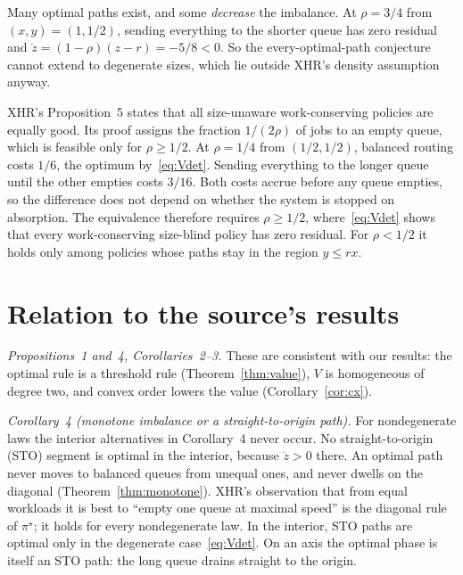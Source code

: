 \documentclass[11pt]{article}
\numberwithin{equation}{section}
\theoremstyle{definition}
\theoremstyle{remark}
\begin{document}
Many optimal paths exist, and some \emph{decrease} the imbalance. At $\rho=3/4$ from $(x,y)=(1,1/2)$, sending everything to the shorter queue has zero residual and $\dot z=(1-\rho)(z-r)=-5/8<0$. So the every-optimal-path conjecture cannot extend to degenerate sizes, which lie outside XHR's density assumption anyway.

XHR's Proposition~5 states that all size-unaware work-conserving policies are equally good. Its proof assigns the fraction $1/(2\rho)$ of jobs to an empty queue, which is feasible only for $\rho\ge1/2$. At $\rho=1/4$ from $(1/2,1/2)$, balanced routing costs $1/6$, the optimum by~\eqref{eq:Vdet}. Sending everything to the longer queue until the other empties costs $3/16$. Both costs accrue before any queue empties, so the difference does not depend on whether the system is stopped on absorption. The equivalence therefore requires $\rho\ge1/2$, where~\eqref{eq:Vdet} shows that every work-conserving size-blind policy has zero residual. For $\rho<1/2$ it holds only among policies whose paths stay in the region $y\le rx$.

\section{Relation to the source's results}\label{sec:source}

\emph{Propositions~1 and~4, Corollaries~2--3.} These are consistent with our results: the optimal rule is a threshold rule (Theorem~\ref{thm:value}), $V$ is homogeneous of degree two, and convex order lowers the value (Corollary~\ref{cor:cx}).

\emph{Corollary~4 (monotone imbalance or a straight-to-origin path).} For nondegenerate laws the interior alternatives in Corollary~4 never occur. No straight-to-origin (STO) segment is optimal in the interior, because $\dot z>0$ there. An optimal path never moves to balanced queues from unequal ones, and never dwells on the diagonal (Theorem~\ref{thm:monotone}). XHR's observation that from equal workloads it is best to ``empty one queue at maximal speed'' is the diagonal rule of $\pi^\star$; it holds for every nondegenerate law. In the interior, STO paths are optimal only in the degenerate case~\eqref{eq:Vdet}. On an axis the optimal phase is itself an STO path: the long queue drains straight to the origin.
\end{document}
